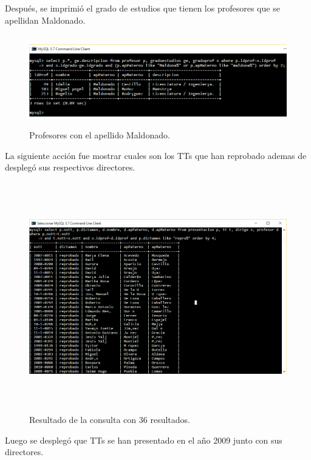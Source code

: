 \documentclass[12pt, titlepage]{article}
\begin{document}
	Después, se imprimió el grado de estudios que tienen los profesores que se apellidan Maldonado.
	
		\begin{figure}[H]
		\begin{center}
			\includegraphics[width=16cm, height=4cm]{img/cinco.png}
			\caption{Profesores con el apellido Maldonado.}
			\label{fig:ejercicio6}
		\end{center}
	\end{figure}
	
	La siguiente acción fue mostrar cuales son los TTs que han reprobado ademas de desplegó sus respectivos directores.
	
	\begin{figure}[H]
		\begin{center}
			\includegraphics[width=16cm, height=10cm]{img/seis.png}
			\caption{Resultado de la consulta con 36 resultados.}
			\label{fig:ejercicio7}
		\end{center}
	\end{figure}
	
	Luego se desplegó que TTs se han presentado en el año 2009 junto con sus directores.
	
\end{document}

